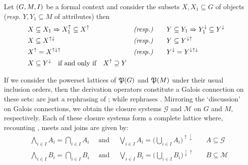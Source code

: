 \begin{proposition}
  \label{proposition:derivation-operators-galois} Let $(G,M,\mathrel{I})$ be a formal context
  and consider the subsets $X,X_{1}\subseteq G$ of objects (\textit{resp.} $Y,Y_{1}
  \subseteq M$ of attributes) then
  \begin{align}
     & X \subseteq X_{1}\Rightarrow X_{1}^{\uparrow}\subseteq X^{\uparrow} & \textit{(resp.)}         & \qquad Y \subseteq Y_{1}\Rightarrow Y_{1}^{\downarrow}\subseteq Y^{\downarrow}\label{equation:galois-1} \\
     & X \subseteq X^{\uparrow \downarrow}                                 & \textit{(resp.)}         & \qquad Y \subseteq Y^{\downarrow \uparrow}\label{equation:galois-2}                                     \\
     & X^{\uparrow}= X^{\uparrow \downarrow \uparrow}                      & \textit{(resp.)}         & \qquad Y^{\downarrow}= Y^{\downarrow \uparrow \downarrow}\label{equation:galois-3}                      \\
     & X \subseteq Y^{\downarrow}\quad \text{if and only if}\quad X^{\uparrow}\supseteq Y             & \label{equation:galois-4}
  \end{align}
\end{proposition}

If we consider the powerset lattices of $\mathfrak{P}({G})$ and $\mathfrak{P}({M})$ under their usual
inclusion orders, then the derivation operators constitute a Galois connection
on these sets:  are just
a rephrasing of ;
while  rephrases . Mirroring
the `discussion' on Galois connections, we obtain the closure systems
$\mathcal{G}$ and $\mathcal{M}$ on $G$ and $M$, respectively. Each of these
closure systems form a complete lattice where, recounting ,
meets and joins are given by:
%
\begin{align*}
   & \underset{i \in I}\bigwedge A_{i}= \underset{i \in I}\bigcap A_{i}\quad \text{ and }\quad \underset{i \in I}\bigvee A_{i}= \big(\underset{i \in I}\bigcup A_{i}\big)^{\uparrow \downarrow} & \quad A\subseteq \mathcal{G} \\
   & \underset{i \in I}\bigwedge B_{i}= \underset{i \in I}\bigcap B_{i}\quad \text{ and }\quad\underset{i \in I}\bigvee B_{i}= \big( \underset{i \in I}\bigcup B_{i}\big)^{\downarrow \uparrow} & \quad B\subseteq \mathcal{M}
\end{align*}

